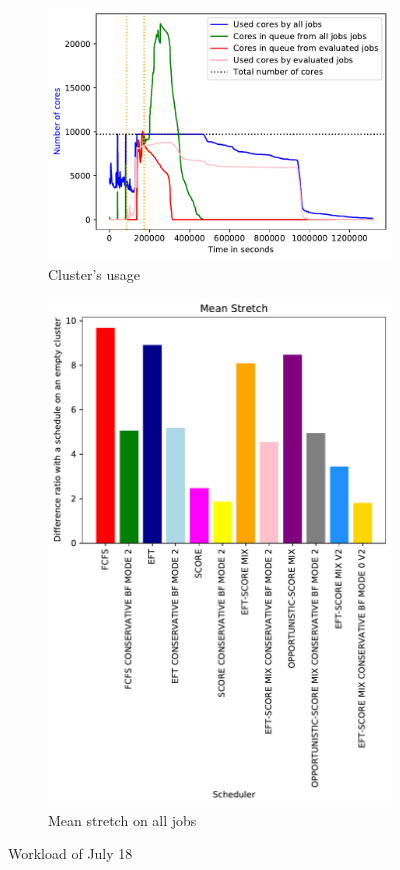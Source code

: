 \documentclass[a4paper]{article}
\begin{document}
\begin{figure}[H]\centering
\begin{subfigure}[b]{0.4\linewidth}\centering\includegraphics[width=1\linewidth]{MBSS/plot/2022-07-18->2022-07-18_V9271_Fcfs_Used_nodes_450_128_32_256_4_1024.pdf}\caption{Cluster's usage}\end{subfigure}
\begin{subfigure}[b]{0.4\linewidth}\centering\includegraphics[width=0.9\linewidth]{MBSS/plot/Results_FCFS_Score_Backfill_2022-07-18->2022-07-18_V9271_Mean_Stretch_450_128_32_256_4_1024.pdf}\caption{Mean stretch on all jobs}\end{subfigure}
\caption{Workload of July 18}\end{figure}
\end{document}
